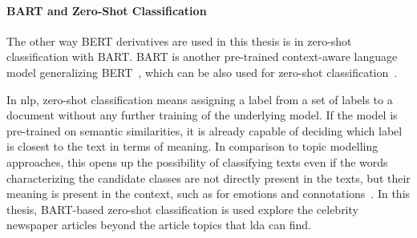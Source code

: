 \paragraph{BART and Zero-Shot Classification}\label{ch:zero_shot}
The other way BERT derivatives are used in this thesis is in zero-shot classification with BART. BART is another pre-trained context-aware language model generalizing BERT~\autocite{lewis_bart_2020}, which can be also used for zero-shot classification~\autocite{huggingfacebart-large-mnli_facebookbart-large-mnli_nodate,davison_zero-shot_2020}.

In \gls{nlp}, zero-shot classification means assigning a label from a set of labels to a document without any further training of the underlying model. If the model is pre-trained on semantic similarities, it is already capable of deciding which label is closest to the text in terms of meaning. In comparison to topic modelling approaches, this opens up the possibility of classifying texts even if the words characterizing the candidate classes are not directly present in the texts, but their meaning is present in the context, such as for emotions and connotations~\autocite{yin_benchmarking_2019}. In this thesis, BART-based zero-shot classification is used explore the celebrity newspaper articles beyond the article topics that \gls{lda} can find.
